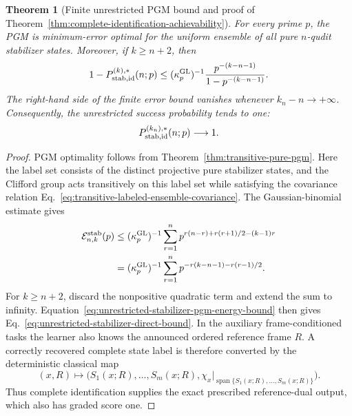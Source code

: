 \documentclass[11pt]{article}
\newcommand{\1}{\mathbf 1}
\theoremstyle{plain}
\newtheorem{theorem}{Theorem}[section]
\theoremstyle{definition}
\theoremstyle{remark}
\begin{document}
\begin{theorem}[Finite unrestricted PGM bound and proof of Theorem~\ref{thm:complete-identification-achievability}]
\label{thm:unrestricted-stabilizer-direct}
For every prime $p$, the PGM is minimum-error optimal for the uniform ensemble
of all pure $n$-qudit stabilizer states.  Moreover, if $k\ge n+2$, then
\begin{equation}
 1-P_{\rm stab,id}^{(k),*}(n;p)
 \le(\kappa_p^{\mathrm{GL}})^{-1}
 \frac{p^{-(k-n-1)}}{1-p^{-(k-n-1)}}.
 \label{eq:unrestricted-stabilizer-direct-bound}
\end{equation}
The right-hand side of the finite error bound vanishes whenever
$k_n-n\to+\infty$.  Consequently, the unrestricted success probability tends
to one:
\begin{equation}
 P_{\rm stab,id}^{(k_n),*}(n;p)\longrightarrow1.
 \label{eq:unrestricted-stabilizer-direct-conclusion}
\end{equation}
\end{theorem}
\begin{proof}
PGM optimality follows from Theorem~\ref{thm:transitive-pure-pgm}.  Here the
label set consists of the distinct projective pure stabilizer states, and the
Clifford group acts transitively on this label set while satisfying the
covariance relation
Eq.~\eqref{eq:transitive-labeled-ensemble-covariance}.  The Gaussian-binomial estimate gives
\begin{align}
 \mathcal E_{n,k}^{\mathrm{stab}}(p)
 &\le(\kappa_p^{\mathrm{GL}})^{-1}
 \sum_{r=1}^n
 p^{r(n-r)+r(r+1)/2-(k-1)r}\notag\\
 &=(\kappa_p^{\mathrm{GL}})^{-1}
 \sum_{r=1}^n
 p^{-r(k-n-1)-r(r-1)/2}.
 \label{eq:unrestricted-stabilizer-energy-estimate}
\end{align}
For $k\ge n+2$, discard the nonpositive quadratic term and extend the sum to
infinity.  Equation~\eqref{eq:unrestricted-stabilizer-pgm-energy-bound} then
gives Eq.~\eqref{eq:unrestricted-stabilizer-direct-bound}.  In the auxiliary frame-conditioned tasks the learner also knows the announced ordered
reference frame $R$.  A correctly recovered complete state label is therefore
converted by the deterministic classical map
\begin{equation}
 (x,R)\longmapsto
 \bigl(S_1(x;R),\ldots,S_m(x;R),
       \chi_x|_{\operatorname{span}\{S_1(x;R),\ldots,S_m(x;R)\}}\bigr).
 \label{eq:complete-to-frame-assisted-partial-postprocessing}
\end{equation}
Thus complete identification supplies the exact prescribed reference-dual
output, which also has graded score one.
\end{proof}
\end{document}
